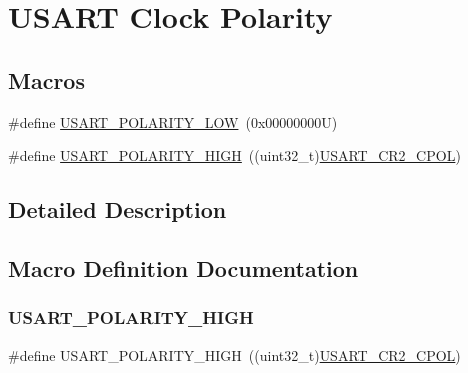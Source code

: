 \hypertarget{group___u_s_a_r_t___clock___polarity}{}\section{U\+S\+A\+RT Clock Polarity}
\label{group___u_s_a_r_t___clock___polarity}
\subsection*{Macros}
\begin{DoxyCompactItemize}
\item 
\#define \hyperlink{group___u_s_a_r_t___clock___polarity_ga5afb62c05704ca0e750ca8f4bb5ccc7d}{U\+S\+A\+R\+T\+\_\+\+P\+O\+L\+A\+R\+I\+T\+Y\+\_\+\+L\+OW}~(0x00000000\+U)
\item 
\#define \hyperlink{group___u_s_a_r_t___clock___polarity_ga3b3e3d798d4797a220346f6b14d257ee}{U\+S\+A\+R\+T\+\_\+\+P\+O\+L\+A\+R\+I\+T\+Y\+\_\+\+H\+I\+GH}~((uint32\+\_\+t)\hyperlink{group___peripheral___registers___bits___definition_gafbb4336ac93d94d4e78f9fb7b3a0dc68}{U\+S\+A\+R\+T\+\_\+\+C\+R2\+\_\+\+C\+P\+OL})
\end{DoxyCompactItemize}


\subsection{Detailed Description}


\subsection{Macro Definition Documentation}
\mbox{\label{group___u_s_a_r_t___clock___polarity_ga3b3e3d798d4797a220346f6b14d257ee}} 
\subsubsection{\texorpdfstring{U\+S\+A\+R\+T\+\_\+\+P\+O\+L\+A\+R\+I\+T\+Y\+\_\+\+H\+I\+GH}{USART\_POLARITY\_HIGH}}
{\footnotesize\ttfamily \#define U\+S\+A\+R\+T\+\_\+\+P\+O\+L\+A\+R\+I\+T\+Y\+\_\+\+H\+I\+GH~((uint32\+\_\+t)\hyperlink{group___peripheral___registers___bits___definition_gafbb4336ac93d94d4e78f9fb7b3a0dc68}{U\+S\+A\+R\+T\+\_\+\+C\+R2\+\_\+\+C\+P\+OL})}

